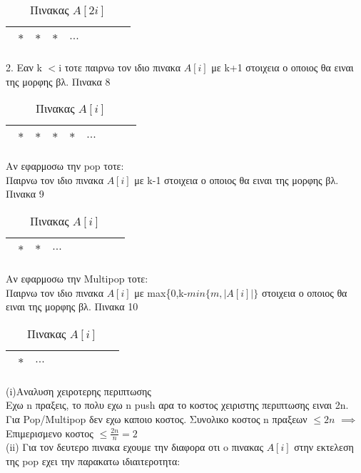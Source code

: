 \documentclass[12pt]{article}
\begin{document}
$$ $$
\begin{table}[H]
\begin{center}
\caption{Πινακας $A[2i]$}
\begin{tabular}{|l|c|r|c|l|l|c|r|}
\hline
\ $*$ & $*$ & $*$ & $...$ & $  $ & $  $ & $  $\\
\hline
\end{tabular}
\end{center}
\end{table}
2. Εαν k $<$i τοτε παιρνω τον ιδιο πινακα $A[i]$ με k+1 στοιχεια ο οποιος θα ειναι της μορφης βλ. Πινακα 8
\begin{table}[H]
\begin{center}
\caption{Πινακας $A[i]$}
\begin{tabular}{|l|c|r|c|l|l|c|r|}
\hline
\ $*$ & $*$ & $*$ & $*$ & $...$ & $ $\\
\hline
\end{tabular}
\end{center}
\end{table}       
$$ $$ $$ $$ 
Αν εφαρμοσω την pop τοτε:$$ $$
Παιρνω τον ιδιο πινακα $A[i]$ με k-1 στοιχεια ο οποιος θα ειναι της μορφης βλ. Πινακα 9
$$ $$
\begin{table}[H]
\begin{center}
\caption{Πινακας $A[i]$}
\begin{tabular}{|l|c|r|c|l|l|c|r|}
\hline
\ $*$ & $*$ & $...$ & $  $ & $  $ & $  $\\
\hline
\end{tabular}
\end{center}
\end{table}
Αν εφαρμοσω την Multipop τοτε:$$ $$
Παιρνω τον ιδιο πινακα $A[i]$ με max\{0,k-$min\{m,|A[i]|\}$ στοιχεια ο οποιος θα ειναι της μορφης βλ. Πινακα 10
$$ $$
\begin{table}[H]
\begin{center}
\caption{Πινακας $A[i]$}
\begin{tabular}{|l|c|r|c|l|l|c|r|}
\hline
\ $*$ & $...$ & $ $ & $  $ & $  $ & $  $\\
\hline
\end{tabular}
\end{center}
\end{table}
$$ $$
 (i)Αναλυση χειροτερης περιπτωσης$$ $$
 Εχω n πραξεις, το πολυ εχω n push αρα το κοστος χειριστης περιπτωσης ειναι 2n. Για Pop/Multipop δεν εχω καποιο κοστος.
 Συνολικο κοστος n πραξεων $\leq 2n$ $\implies$ Επιμερισμενο κοστος $\leq \frac{2n}{n}=2$ $$ $$
 (ii) Για τον δευτερο πινακα εχουμε την διαφορα οτι o πινακας $A[i]$ στην εκτελεση της pop εχει την παρακατω ιδιαιτεροτητα:
 
\end{document}
